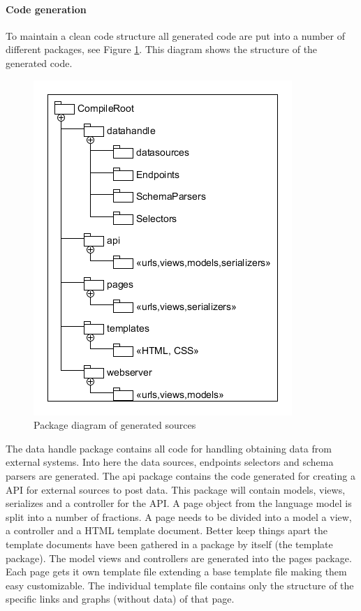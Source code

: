 \paragraph{Code generation}
To maintain a clean code structure all generated code are put into a number of different packages, see Figure \ref{fig:packagediagram}.
This diagram shows the structure of the generated code.
\begin{figure}
\begin{center}
\includegraphics[width=\linewidth]{images/PackageDiagram}
\end{center}
\caption{Package diagram of generated sources}
\label{fig:packagediagram}
\end{figure}
The data handle package contains all code for handling obtaining data from external systems. 
Into here the data sources, endpoints selectors and schema parsers are generated.
The api package contains the code generated for creating a API for external sources to post data.
This package will contain  models, views, serializes and a controller for the API.
A page object from the language model is split into a number of fractions.
A page needs to be divided into a model a view, a controller and a HTML template document.
Better keep things apart the template documents have been gathered in a package by itself (the template package).
The model views and controllers are generated into the pages package.
Each page gets it own template file extending a base template file making them easy customizable.
The individual template file contains only the structure of the specific links and graphs (without data) of that page.

